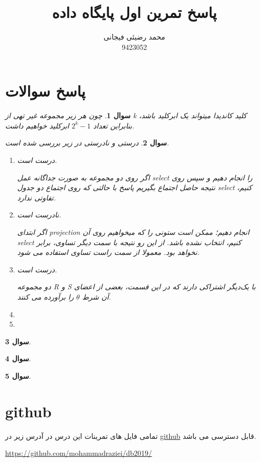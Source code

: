 \documentclass[12pt]{article}
\title{پاسخ تمرین اول پایگاه داده}
\author{محمد رضیئی فیجانی\\ 9423052}
\newtheorem{question}{سوال}
\begin{document}
\maketitle

\section{پاسخ سوالات}\label{chpt1}
\begin{question}
	چون هر زیر مجموعه غیر تهی از k کلید کاندیدا میتواند یک ابرکلید باشد، بنابراین تعداد 
	$2^k - 1$
	ابرکلید خواهیم داشت.
\end{question}
\begin{question}
درستی و نادرستی در زیر بررسی شده است.
\begin{enumerate}
	\item
	درست است.
	
	اگر روی دو مجموعه به صورت جداگانه عمل select را انجام دهیم و سپس روی نتیجه حاصل اجتماع بگیریم پاسخ با حالتی که روی اجتماع دو جدول select کنیم، تفاوتی ندارد.
	
	\item
	نادرست است.
	
	اگر ابتدای projection انجام دهیم؛ ممکن است ستونی را که میخواهیم روی آن select کنیم، انتخاب نشده باشد. از این رو نتیجه با سمت دیگر تساوی، برابر نخواهد بود. معمولا از سمت راست تساوی استفاده می شود.
	
	\item
	درست است.
	
	دو مجموعه R  و S با یک‌دیگر اشتراکی دارند که در این قسمت، بعضی از اعضای آن شرط $\theta$ را برآورده می کنند.
	
	\item

	
	\item
	
	
	
	
	
\end{enumerate}
\end{question}
\begin{question}
	
\end{question}
\begin{question}
	
\end{question}
\begin{question}
	
\end{question}

\section{github}\label{chpt2}
تمامی فایل های تمرینات این درس در آدرس زیر در 
\href{https://github.com/mohammadraziei/db2019/}{github}
قابل دسترسی می باشد.

\begin{latin}
\begin{center}
{\href{https://github.com/mohammadraziei/db2019/}{https://github.com/mohammadraziei/db2019/}}
\end{center}
\end{latin}
\end{document}
